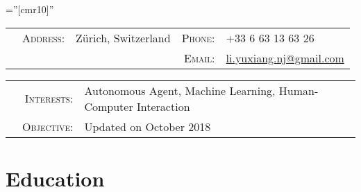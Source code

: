 \documentclass[a4paper,10pt]{article} %
\begin{document}
\pagestyle{empty} %

\font\fb=''[cmr10]'' %


\par{} %
\vspace{0.1cm}

\begin{tabular}{@{}p{0.66cm}rp{8.75cm}rl}
& \textsc{Address:} & Zürich, Switzerland & \textsc{Phone:} & +33 6 63 13 63 26 \\
& & & \textsc{Email:} & \href{mailto:li.yuxiang.nj@gmail.com}{li.yuxiang.nj@gmail.com}
\end{tabular}

\begin{tabular}{p{0.205cm}rl}
& \textsc{Interests:} & Autonomous Agent, Machine Learning, Human-Computer Interaction \\
& \textsc{Objective:} & Updated on October 2018
\end{tabular}


\section{Education}
\end{document}
